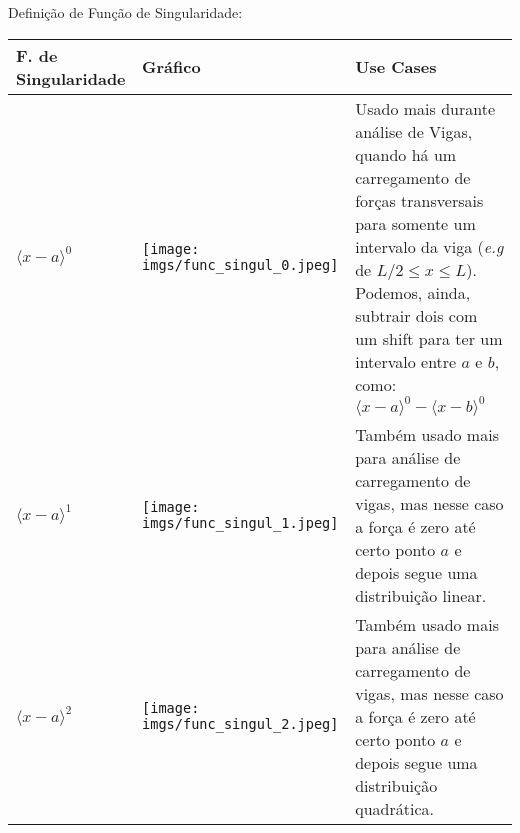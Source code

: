 \documentclass{article}
\begin{document}
            Definição de Função de Singularidade:
            \begin{table}[h]
                \tiny
                \centering
                \begin{tabularx}{\textwidth}{|X|X|l|}\hline
                    \textbf{F. de Singularidade} & \textbf{Gráfico} & \textbf{Use Cases} \\ \hline
                    $\langle x - a\rangle^0$ & 
                        \begin{minipage}{.3\textwidth}
                            \centering
                            \texttt{[image: imgs/func\_singul\_0.jpeg]}
                        \end{minipage}&
                        \begin{minipage}{.4\textwidth}
                            Usado mais durante análise de Vigas, quando há um carregamento de forças transversais para somente um intervalo da viga (\emph{e.g} de $L/2 \le x \le L$). Podemos,
                            ainda, subtrair dois com um shift para ter um intervalo entre $a$ e $b$, como: $\langle x - a\rangle^0 - \langle x - b\rangle^0$ 
                        \end{minipage}  \\ \hline

                    $\langle x - a\rangle^1$ & 
                        \begin{minipage}{.3\textwidth}
                            \centering
                            \texttt{[image: imgs/func\_singul\_1.jpeg]}
                        \end{minipage}&
                        \begin{minipage}{.4\textwidth}
                            Também usado mais para análise de carregamento de vigas, mas nesse caso a força é zero até certo ponto $a$ e depois segue uma distribuição linear.
                        \end{minipage}  \\ \hline

                    $\langle x - a\rangle^2$ & 
                        \begin{minipage}{.3\textwidth}
                            \centering
                            \texttt{[image: imgs/func\_singul\_2.jpeg]}
                        \end{minipage}&
                        \begin{minipage}{.4\textwidth}
                            Também usado mais para análise de carregamento de vigas, mas nesse caso a força é zero até certo ponto $a$ e depois segue uma distribuição quadrática.
                        \end{minipage}  \\ \hline
                    

\end{tabularx}
\end{table}
\end{document}
